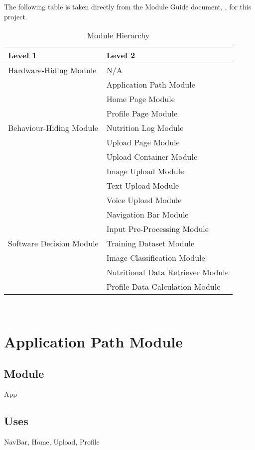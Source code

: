 \documentclass[12pt, titlepage]{article}
\begin{document}
The following table is taken directly from the Module Guide document, \cite{MG}, for this project.

\begin{table}[H]
	\centering
	\begin{tabular}{p{} p{}}
		\toprule
		\textbf{Level 1} & \textbf{Level 2}\\
		\midrule
		
		{Hardware-Hiding Module} & N/A \\
		\midrule
		
		\multirow{7}{0.3\textwidth}{Behaviour-Hiding Module} & Application Path Module\\
		& Home Page Module\\
		& Profile Page Module\\
		& Nutrition Log Module\\
		& Upload Page Module\\
		& Upload Container Module \\
		& Image Upload Module\\
		& Text Upload Module \\
		& Voice Upload Module \\
		& Navigation Bar Module\\ 
		\midrule
		
		\multirow{3}{0.3\textwidth}{Software Decision Module} & Input Pre-Processing Module\\
		& Training Dataset Module\\
		& Image Classification Module\\
		& Nutritional Data Retriever Module\\
		& Profile Data Calculation Module\\
		\bottomrule
		
	\end{tabular}
	\caption{Module Hierarchy}
	\label{TblMH}
\end{table}

~\newpage

\section{Application Path Module} \label{App}
\subsection{Module}
App
\subsection{Uses}
NavBar, Home, Upload, Profile
\end{document}
